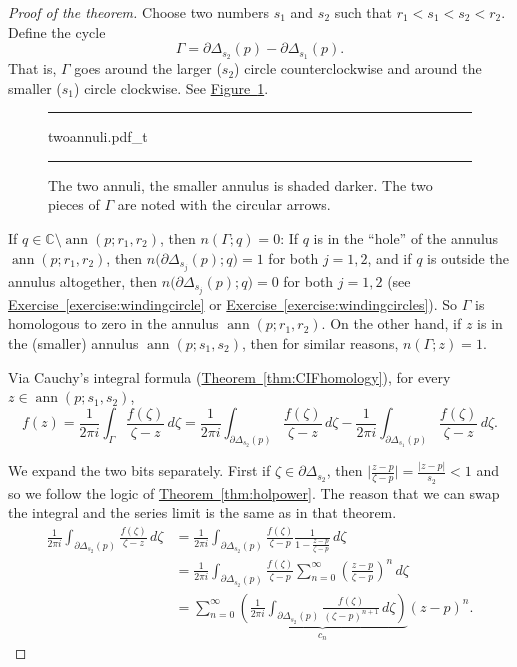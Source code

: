 \documentclass[12pt,openany]{book}
\newcommand{\ann}{\operatorname{ann}}
\newcommand{\sabs}[1]{\lvert {#1} \rvert}
\newcommand{\babs}[1]{\bigl\lvert {#1} \bigr\rvert}
\newcommand{\C}{{\mathbb{C}}}
\newcommand{\myquote}[1]{``#1''}
\theoremstyle{plain}
\theoremstyle{remark}
\theoremstyle{definition}
\newenvironment{myfig}{%
\begin{figure}[h!t]
\noindent\rule{\textwidth}{0.5pt}\vspace{12pt}\par\centering}%
{\par\noindent\rule{\textwidth}{0.5pt}
\end{figure}}
\theoremstyle{exercise}
\theoremstyle{example}
\newcommand{\figureref}[1]{\hyperref[#1]{Figure~\ref*{#1}}}
\newcommand{\exerciseref}[1]{\hyperref[#1]{Exercise~\ref*{#1}}}
\newcommand{\thmref}[1]{\hyperref[#1]{Theorem~\ref*{#1}}}
\begin{document}
\begin{proof}[Proof of the theorem]
Choose two numbers $s_1$ and $s_2$ such that $r_1 < s_1 < s_2 < r_2$.
Define the cycle
\begin{equation*}
\Gamma = \partial \Delta_{s_2}(p) - \partial \Delta_{s_1}(p) .
\end{equation*}
That is, $\Gamma$ goes around the larger ($s_2$) circle counterclockwise and
around the smaller ($s_1$) circle clockwise.
See \figureref{fig:twoannuli}.

\begin{myfig}
{twoannuli.pdf_t}
\caption{The two annuli, the smaller annulus is shaded darker.  The two
pieces of $\Gamma$ are noted with the circular arrows.\label{fig:twoannuli}}
\end{myfig}

If $q \in \C \setminus \ann(p;r_1,r_2)$, then $n(\Gamma;q) = 0$:
If $q$ is in the \myquote{hole} of the annulus $\ann(p;r_1,r_2)$, then
$n\bigl(\partial \Delta_{s_j}(p);q\bigr) = 1$ for both $j=1,2$, and 
if $q$ is outside the annulus altogether, then
$n\bigl(\partial \Delta_{s_j}(p);q\bigr) = 0$ for both $j=1,2$ 
(see \exerciseref{exercise:windingcircle} or
\exerciseref{exercise:windingcircles}).
So $\Gamma$ is homologous to zero in the annulus $\ann(p;r_1,r_2)$.
On the other hand, if $z$ is in the (smaller) annulus $\ann(p;s_1,s_2)$,
then for similar reasons, $n(\Gamma;z) = 1$.

Via Cauchy's integral formula (\thmref{thm:CIFhomology}), for every $z \in \ann(p;s_1,s_2)$,
\begin{equation*}
f(z) = 
\frac{1}{2\pi i}
\int_{\Gamma} \frac{f(\zeta)}{\zeta-z} \, d\zeta 
=
\frac{1}{2\pi i}
\int_{\partial \Delta_{s_2}(p)} \frac{f(\zeta)}{\zeta-z} \, d\zeta 
-
\frac{1}{2\pi i}
\int_{\partial \Delta_{s_1}(p)} \frac{f(\zeta)}{\zeta-z} \, d\zeta  .
\end{equation*}

We expand the two bits separately.  First
if $\zeta \in \partial \Delta_{s_2}$, then
$\babs{\frac{z-p}{\zeta-p}} = \frac{\sabs{z-p}}{s_2} < 1$ and so
we follow the logic of \thmref{thm:holpower}.  The reason that we can
swap the integral and the series limit is the same as in that theorem.
\begin{equation*}
\begin{split}
\frac{1}{2\pi i}
\int_{\partial \Delta_{s_2}(p)} \frac{f(\zeta)}{\zeta-z} \, d\zeta 
& =
\frac{1}{2\pi i}
\int_{\partial \Delta_{s_2}(p)} \frac{f(\zeta)}{\zeta-p}
\frac{1}{1-\frac{z-p}{\zeta-p}} \, d\zeta
\\
& =
\frac{1}{2\pi i}
\int_{\partial \Delta_{s_2}(p)} \frac{f(\zeta)}{\zeta-p}
\sum_{n=0}^\infty
{\left(\frac{z-p}{\zeta-p}\right)}^n \, d\zeta
\\
& =
\sum_{n=0}^\infty
\underbrace{
\left(
\frac{1}{2\pi i}
\int_{\partial \Delta_{s_2}(p)} \frac{f(\zeta)}{{(\zeta-p)}^{n+1}}
 \, d\zeta
\right)
}_{c_n}
{(z-p)}^n .
\end{split}
\end{equation*}


\end{proof}
\end{document}
